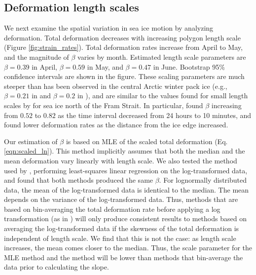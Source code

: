 \documentclass[aog]{igs}
\begin{document}
\subsection{Deformation length scales}
We next examine the spatial variation in sea ice motion by analyzing deformation.
Total deformation decreases with increasing polygon length scale (Figure \ref{fig:strain_rates}).
Total deformation rates increase from April to May, and the magnitude of $\beta$ varies by month.
Estimated length scale parameters are $\beta=0.39$ in April, $\beta=0.59$ in May, and $\beta=0.47$ in June.
Bootstrap 95\% confidence intervals are shown in the figure.
These scaling parameters are much steeper than has been observed in the central Arctic winter pack ice (e.g., $\beta=0.21$ in \cite{Hutchings2012} and $\beta=0.2$ in \cite{Marsan2004}), and are similar to the values found for small length scales by \cite{oikkonen2017_SmallScale} for sea ice north of the Fram Strait.
In particular, \cite{oikkonen2017_SmallScale} found $\beta$ increasing from $0.52$ to $0.82$ as the time interval decreased from 24 hours to 10 minutes, and found lower deformation rates as the distance from the ice edge increased.

Our estimation of $\beta$ is based on MLE of the scaled total deformation (Eq. \ref{eqn:scaled_ln}). This method implicitly assumes that both the median and the mean deformation vary linearly with length scale. 
We also tested the method used by \cite{itkin2017_ThinIce}, performing least-squares linear regression on the log-transformed data, and found that both methods produced the same $\beta$.
For lognormally distributed data, the mean of the log-transformed data is identical to the median. The mean depends on the variance of the log-transformed data. Thus, methods that are based on bin-averaging the total deformation rate before applying a log transformation (as in \cite{Marsan2004}) will only produce consistent results to methods based on averaging the log-transformed data if the skewness of the total deformation is independent of length scale.
We find that this is not the case: as length scale increases, the mean comes closer to the median. Thus, the scale parameter for the MLE method and the \cite{itkin2017_ThinIce} method will be lower than methods that bin-average the data prior to calculating the slope.
\end{document}

